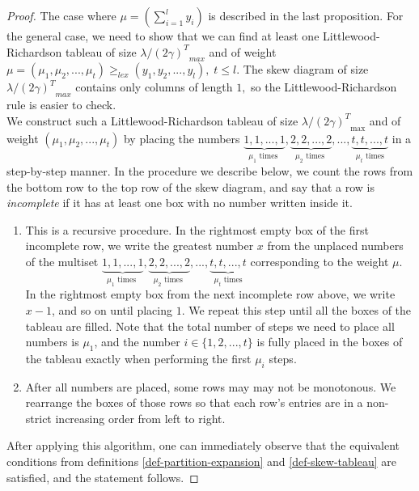 \documentclass[main.tex]{subfiles}
\begin{document}
\begin{proof}
    The case where $\mu = (\sum\limits_{i=1}^{l}y_i)$ is described in the last proposition. For the general case, we need to show that we can find at least one Littlewood-Richardson tableau of size $\lambda/{(2\gamma)^T}_{max}$ and of weight $\mu = (\mu_1, \mu_2, ..., \mu_t)\geq_{lex} (y_1, y_2, ..., y_l),\; t\leq l$. The skew diagram of size $\lambda/{(2\gamma)^T}_{max}$ contains only columns of length $1,$ so the Littlewood-Richardson rule is easier to check.  \\

   We construct such a Littlewood-Richardson tableau of size $\lambda/{(2\gamma)^T}_{\text{max}}$ and of weight $(\mu_1, \mu_2,..., \mu_t)$ by placing the numbers $\underbrace{1,1,...,1}_{\mu_1 \text{ times }}, \underbrace{2,2,...,2}_{\mu_2 \text{ times }}, ..., \underbrace{t,t,...,t}_{\mu_t \text{ times}}$  in a step-by-step manner. In the procedure we describe below, we count the rows from the bottom row to the top row of the skew diagram, and say that a row is \textit{incomplete} if it has at least one box with no number written inside it.

    \begin{enumerate}
        \item This is a recursive procedure. In the rightmost empty box of the first incomplete row, we write the greatest number $x$ from the unplaced numbers of the multiset $\underbrace{1,1,...,1}_{\mu_1 \text{ times }}, \underbrace{2,2,...,2}_{\mu_2 \text{ times }}, ..., \underbrace{t,t,...,t}_{\mu_t \text{ times}}$ corresponding to the weight $\mu$. In the rightmost empty box from the next incomplete row above,  we write $x-1$, and so on until placing $1$. We repeat this step until all the boxes of the tableau are filled. Note that the total number of steps we need to place all numbers is $\mu_1$, and the number $i\in\{1,2,...,t\}$ is fully placed in the boxes of the tableau exactly when performing the first $\mu_i$ steps.

        \item After all numbers are placed, some rows may may not be monotonous. We rearrange the boxes of those rows so that each row's entries are in a non-strict increasing order from left to right.

    \end{enumerate}

    After applying this algorithm, one can immediately observe that the equivalent conditions from definitions \ref{def-partition-expansion} and \ref{def-skew-tableau} are satisfied, and the statement follows.

\end{proof}
\bigskip
\end{document}
